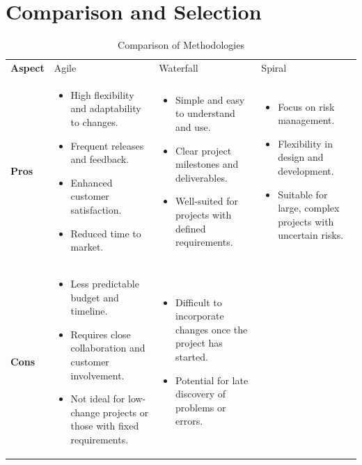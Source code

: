 \section{Comparison and Selection}
\begin{table}[htbp]
    \centering
    \caption{Comparison of Methodologies}
    \label{tab:methodologies}
    \begin{tabularx}{\textwidth}{>{\bfseries}lXXX}
    \toprule
    Aspect & Agile & Waterfall & Spiral \\
    \addlinespace
    Pros & 
    \begin{itemize}
        \item High flexibility and adaptability to changes.
        \item Frequent releases and feedback.
        \item Enhanced customer satisfaction.
        \item Reduced time to market.
    \end{itemize} & 
    \begin{itemize}
        \item Simple and easy to understand and use.
        \item Clear project milestones and deliverables.
        \item Well-suited for projects with defined requirements.
    \end{itemize} & 
    \begin{itemize}
        \item Focus on risk management.
        \item Flexibility in design and development.
        \item Suitable for large, complex projects with uncertain risks.
    \end{itemize} \\
    \addlinespace
    Cons & 
    \begin{itemize}
        \item Less predictable budget and timeline.
        \item Requires close collaboration and customer involvement.
        \item Not ideal for low-change projects or those with fixed requirements.
    \end{itemize} & 
    \begin{itemize}
        \item Difficult to incorporate changes once the project has started.
        \item Potential for late discovery of problems or errors.

\end{itemize}
\end{tabularx}
\end{table}
